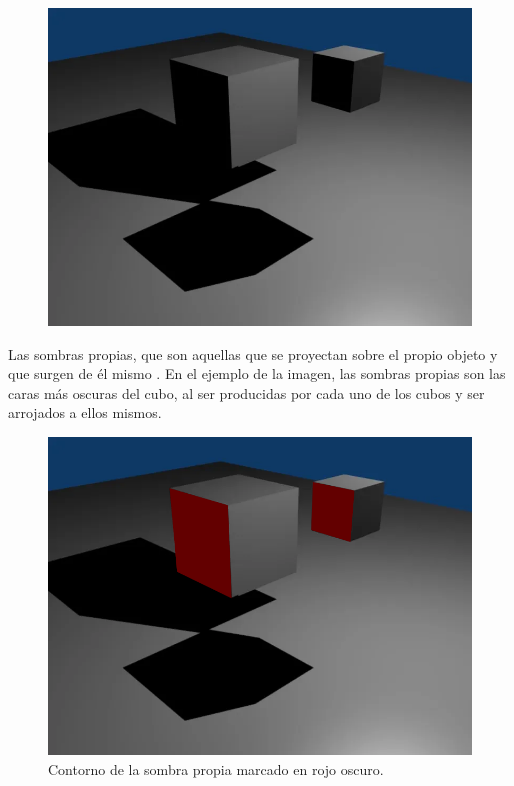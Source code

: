 \documentclass{article}
\begin{document}
\begin{figure}[H]
    \centering
    \includegraphics[width=\textwidth]{imagenes/sombra0004.png}
 \end{figure}    

Las sombras propias, que son aquellas que se proyectan sobre el propio objeto y que surgen de él mismo \cite{sombras}. En el ejemplo de la imagen, las sombras propias son las caras más oscuras del cubo, al ser producidas por cada uno de los cubos y ser arrojados a ellos mismos.


\begin{figure}[H]
    \centering
    \includegraphics[width=\textwidth]{imagenes/sombra0004propia.png}
    \caption{Contorno de la sombra propia marcado en rojo oscuro.}
 \end{figure}    
\end{document}
